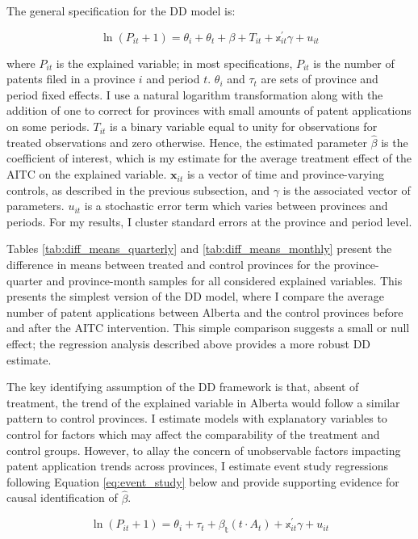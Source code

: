 \documentclass[../main.tex]{subfiles}
\begin{document}
The general specification for the DD model is:

\begin{equation}
    \label{eq:dd_model}
    \ln(P_{it} + 1) = \theta_i + \theta_t + \beta + T_{it} + \mathbb{x}_{it}^{'} \gamma + u_{it}
\end{equation}

where $P_{it}$ is the explained variable; in most specifications, $P_{it}$ is the number of patents filed in a province $i$ and period $t$. $\theta_i$ and $\tau_t$ are sets of province and period fixed effects. I use a natural logarithm transformation along with the addition of one to correct for provinces with small amounts of patent applications on some periods. $T_{it}$ is a binary variable equal to unity for observations for treated observations and zero otherwise. Hence, the estimated parameter $\hat{\beta}$ is the coefficient of interest, which is my estimate for the average treatment effect of the AITC on the explained variable. $\mathbf{x}_{it}$ is a vector of time and province-varying controls, as described in the previous subsection, and $\gamma$ is the associated vector of parameters. $u_{it}$ is a stochastic error term which varies between provinces and periods. For my results, I cluster standard errors at the province and period level. 

Tables \ref{tab:diff_means_quarterly} and \ref{tab:diff_means_monthly} present the difference in means between treated and control provinces for the province-quarter and province-month samples for all considered explained variables. This presents the simplest version of the DD model, where I compare the average number of patent applications between Alberta and the control provinces before and after the AITC intervention. This simple comparison suggests a small or null effect; the regression analysis described above provides a more robust DD estimate. 

The key identifying assumption of the DD framework is that, absent of treatment, the trend of the explained variable in Alberta would follow a similar pattern to control provinces. I estimate models with explanatory variables to control for factors which may affect the comparability of the treatment and control groups. However, to allay the concern of unobservable factors impacting patent application trends across provinces, I estimate event study regressions following Equation \ref{eq:event_study} below and provide supporting evidence for causal identification of $\hat{\beta}$.

\begin{equation}
    \label{eq:event_study}
   \ln(P_{it} + 1) = \theta_i + \tau_t + \mathbb{\beta_t}(t \cdot A_t) + \mathbb{x}_{it}^{'}\gamma + u_{it}
\end{equation}
\end{document}
